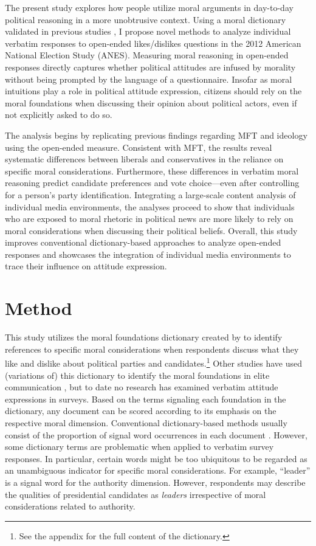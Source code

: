 \documentclass[12pt]{article}
\begin{document}
The present study explores how people utilize moral arguments in day-to-day political reasoning in a more unobtrusive context. Using a moral dictionary validated in previous studies \citep{graham2009liberals}, I propose novel methods to analyze individual verbatim responses to open-ended likes/dislikes questions in the 2012 American National Election Study (ANES). Measuring moral reasoning in open-ended responses directly captures whether political attitudes are infused by morality without being prompted by the language of a questionnaire. Insofar as moral intuitions play a role in political attitude expression, citizens should rely on the moral foundations when discussing their opinion about political actors, even if not explicitly asked to do so.

The analysis begins by replicating previous findings regarding MFT and ideology using the open-ended measure. Consistent with MFT, the results reveal systematic differences between liberals and conservatives in the reliance on specific moral considerations. Furthermore, these differences in verbatim moral reasoning predict candidate preferences and vote choice---even after controlling for a person's party identification. Integrating a large-scale content analysis of individual media environments, the analyses proceed to show that individuals who are exposed to moral rhetoric in political news are more likely to rely on moral considerations when discussing their political beliefs. Overall, this study improves conventional dictionary-based approaches to analyze open-ended responses and showcases the integration of individual media environments to trace their influence on attitude expression.


\section*{Method}

This study utilizes the moral foundations dictionary created by \citet{graham2009liberals} to identify references to specific moral considerations when respondents discuss what they like and dislike about political parties and candidates.\footnote{See the appendix for the full content of the dictionary.} Other studies have used (variations of) this dictionary to identify the moral foundations in elite communication \citep[e.g.][]{clifford2015concerns}, but to date no research has examined verbatim attitude expressions in surveys. Based on the terms signaling each foundation in the dictionary, any document can be scored according to its emphasis on the respective moral dimension. Conventional dictionary-based methods usually consist of the proportion of signal word occurrences in each document \citep[e.g.][]{graham2009liberals}. However, some dictionary terms are problematic when applied to verbatim survey responses. In particular, certain words might be too ubiquitous to be regarded as an unambiguous indicator for specific moral considerations. For example, ``leader'' is a signal word for the authority dimension. However, respondents may describe the qualities of presidential candidates as \textit{leaders} irrespective of moral considerations related to authority.
\end{document}
